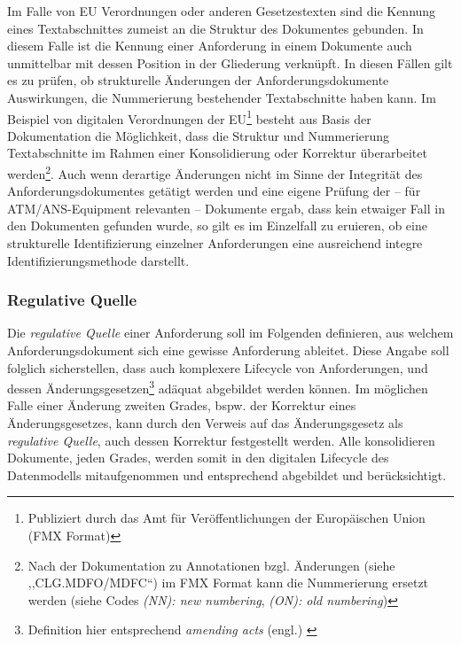 Im Falle von EU Verordnungen oder anderen Gesetzestexten sind die Kennung eines Textabschnittes zumeist an die Struktur des Dokumentes gebunden. 
In diesem Falle ist die Kennung einer Anforderung in einem Dokumente auch unmittelbar mit dessen Position in der Gliederung verknüpft. 
In diesen Fällen gilt es zu prüfen, ob strukturelle Änderungen der Anforderungsdokumente Auswirkungen, die Nummerierung bestehender Textabschnitte haben kann.
Im Beispiel von digitalen Verordnungen der EU\footnote{Publiziert durch das Amt für Veröffentlichungen der Europäischen Union (FMX Format)} besteht aus Basis der Dokumentation die Möglichkeit, dass die Struktur und Nummerierung Textabschnitte im Rahmen einer Konsolidierung oder Korrektur überarbeitet werden\footnote{Nach der Dokumentation zu Annotationen bzgl. Änderungen (siehe ,,CLG.MDFO/MDFC``) im FMX Format kann die Nummerierung ersetzt werden (siehe Codes \textit{(NN): new numbering}, \textit{(ON): old numbering})\cite[vgl S. 76-79]{eu_fmx4_proc}}. 
Auch wenn derartige Änderungen nicht im Sinne der Integrität des Anforderungsdokumentes getätigt werden und eine eigene Prüfung der -- für ATM/ANS-Equipment relevanten -- Dokumente ergab, dass kein etwaiger Fall in den Dokumenten gefunden wurde, so gilt es im Einzelfall zu eruieren, ob eine strukturelle Identifizierung einzelner Anforderungen eine ausreichend integre Identifizierungsmethode darstellt. 


\subsubsection{Regulative Quelle}

Die \textit{regulative Quelle} einer Anforderung soll im Folgenden definieren, aus welchem Anforderungsdokument sich eine gewisse Anforderung ableitet. 
Diese Angabe soll folglich sicherstellen, dass auch komplexere Lifecycle von Anforderungen, und dessen Änderungsgesetzen\footnote{Definition hier entsprechend  \textit{amending acts} (engl.) \cite{eu_consolidation}} adäquat abgebildet werden können.
Im möglichen Falle einer Änderung zweiten Grades, bspw. der Korrektur eines Änderungsgesetzes, kann durch den Verweis auf das Änderungsgesetz als \textit{regulative Quelle}, auch dessen Korrektur festgestellt werden. 
Alle konsolidieren Dokumente, jeden Grades, werden somit in den digitalen Lifecycle des Datenmodells mitaufgenommen und entsprechend abgebildet und berücksichtigt.  


